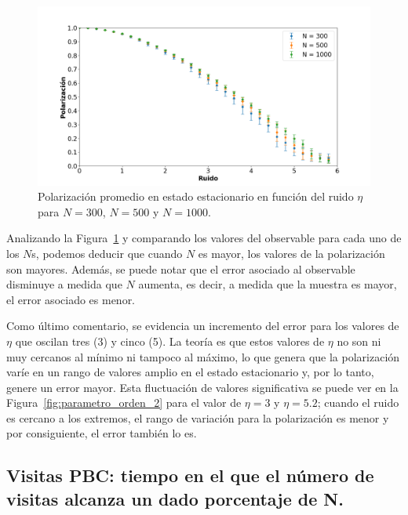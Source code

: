 \documentclass[11pt, a4paper]{article}
\begin{document}
            \begin{figure}[H]
                \centering
                \includegraphics[width=\textwidth]{./va_vs_eta}
                \caption{Polarización promedio en estado estacionario en función del ruido $\eta$ para $N=300$, $N=500$ y $N=1000$.}
                \label{fig:parametro_orden_3}
            \end{figure}

            Analizando la Figura~\ref{fig:parametro_orden_3} y comparando los valores del observable para cada uno de los $N$s, podemos deducir que
            cuando $N$ es mayor, los valores de la polarización son mayores.
            Además, se puede notar que el error asociado al observable disminuye a medida que $N$ aumenta, es decir, a
            medida que la muestra es mayor, el error asociado es menor.

            Como último comentario, se evidencia un incremento del error para los valores de $\eta$ que oscilan tres (3) y cinco (5).
            La teoría es que estos valores de $\eta$ no son ni muy cercanos al mínimo ni tampoco al máximo, lo que genera que
            la polarización varíe en un rango de valores amplio en el estado estacionario y, por lo tanto, genere un error
            mayor.
            Esta fluctuación de valores significativa se puede ver en la Figura~\ref{fig:parametro_orden_2} para el valor de $\eta = 3$ y
            $\eta = 5.2$; cuando el ruido es cercano a los extremos, el rango de variación para la polarización es menor y por
            consiguiente, el error también lo es.

        \subsection{Visitas PBC: tiempo en el que el número de visitas alcanza un dado porcentaje de N.}
        \label{subsec:resultados-visitas-pbc}
\end{document}
